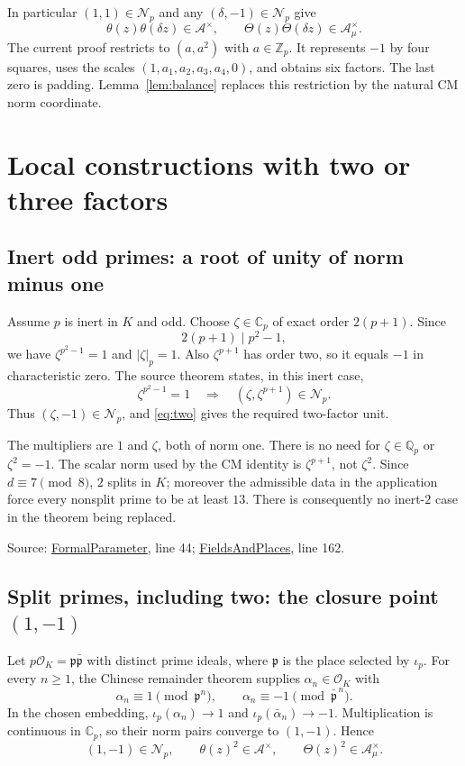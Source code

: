 \documentclass[11pt,letterpaper]{article}
\theoremstyle{remark}\newtheorem{remark}[theorem]{Remark}
\newcommand{\Cp}{\mathbb C_p}
\newcommand{\Qp}{\mathbb Q_p}
\newcommand{\Zp}{\mathbb Z_p}
\newcommand{\OO}{\mathcal O}
\newcommand{\A}{\mathcal A}
\newcommand{\Np}{\mathcal N_p}
\newcommand{\Src}[2]{\href{https://github.com/VladimirReshetnikov/ProveIt/blob/89d12dd40424f1217fd818d84877b3da52396a3b/Analysis/GeneralizedRiemannHypothesis/Lean/grh/src/#1}{#2}}
\newcommand{\decl}[1]{\textnormal{\small\texttt{\detokenize{#1}}}}
\newcommand{\source}[1]{\par{\small\color{quiet}\textsf{Source:} #1}\par}
\begin{document}
In particular $(1,1)\in\Np$ and any $(\delta,-1)\in\Np$ give
\begin{equation}
 \theta(z)\theta(\delta z)\in\A^\times,
 \qquad \Theta(z)\Theta(\delta z)\in\A_\mu^\times.
 \label{eq:two}
\end{equation}
The current proof restricts to $(a,a^2)$ with $a\in\Zp$. It represents
$-1$ by four squares, uses the scales $(1,a_1,a_2,a_3,a_4,0)$, and obtains
six factors. The last zero is padding. Lemma~\ref{lem:balance} replaces
this restriction by the natural CM norm coordinate.\cite{leastval}

\section{Local constructions with two or three factors}
\label{sec:local}

\subsection{Inert odd primes: a root of unity of norm minus one}

Assume $p$ is inert in $K$ and odd. Choose $\zeta\in\Cp$ of exact order
$2(p+1)$. Since
\[
 2(p+1)\mid p^2-1,
\]
we have $\zeta^{p^2-1}=1$ and $|\zeta|_p=1$. Also
$\zeta^{p+1}$ has order two, so it equals $-1$ in characteristic zero.
The source theorem
\decl{mem_normPairClosure_of_pow_eq_one} states, in this inert case,
\[
 \zeta^{p^2-1}=1
 \quad\Longrightarrow\quad
 (\zeta,\zeta^{p+1})\in\Np.
\]
Thus $(\zeta,-1)\in\Np$, and \eqref{eq:two} gives the required
two-factor unit.

The multipliers are $1$ and $\zeta$, both of norm one. There is no need
for $\zeta\in\Qp$ or $\zeta^2=-1$. The scalar norm used by the CM
identity is $\zeta^{p+1}$, not $\zeta^2$.
Since $d\equiv7\pmod8$, $2$ splits in $K$; moreover the admissible data
in the application force every nonsplit prime to be at least $13$.
There is consequently no inert-$2$ case in the theorem being replaced.
\source{\Src{Lib/CM/FormalGroup/FormalParameter.lean}{FormalParameter}, line 44;
\Src{New/Reduction/Data/FieldsAndPlaces.lean}{FieldsAndPlaces}, line 162.}

\subsection{Split primes, including two: the closure point \texorpdfstring{$(1,-1)$}{(1,-1)}}

Let $p\OO_K=\mathfrak p\bar{\mathfrak p}$ with distinct prime ideals,
where $\mathfrak p$ is the place selected by $\iota_p$. For every
$n\geq1$, the Chinese remainder theorem supplies $\alpha_n\in\OO_K$
with
\[
 \alpha_n\equiv1\pmod{\mathfrak p^n},\qquad
 \alpha_n\equiv-1\pmod{\bar{\mathfrak p}^{\,n}}.
\]
In the chosen embedding, $\iota_p(\alpha_n)\longrightarrow1$ and
$\iota_p(\bar\alpha_n)\longrightarrow-1$. Multiplication is continuous
in $\Cp$, so their norm pairs converge to $(1,-1)$. Hence
\begin{equation}
 (1,-1)\in\Np,\qquad\theta(z)^2\in\A^\times,
 \qquad\Theta(z)^2\in\A_\mu^\times.
 \label{eq:split}
\end{equation}
\end{document}
